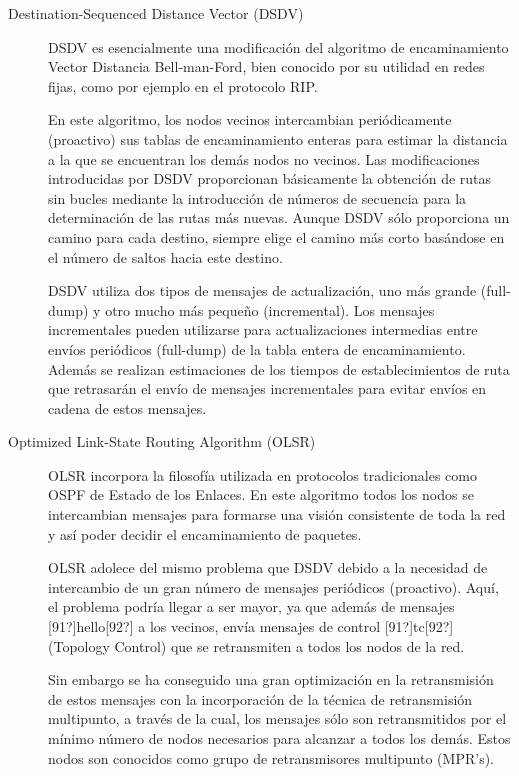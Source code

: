 \begin{description}
\item[Destination-Sequenced Distance Vector (DSDV)] 
DSDV es esencialmente una modificaci\'on del algoritmo de encaminamiento Vector Distancia Bell-man-Ford, bien conocido por su utilidad en redes fijas, como por ejemplo en el protocolo RIP. 

En este algoritmo, los nodos vecinos intercambian peri\'odicamente (proactivo) sus tablas de encaminamiento enteras para estimar la distancia a la que se encuentran los dem\'as nodos no vecinos. Las modificaciones introducidas por DSDV proporcionan b\'asicamente la obtenci\'on de rutas sin bucles mediante la introducci\'on de n\'umeros de secuencia para la determinaci\'on de las rutas m\'as nuevas. Aunque DSDV s\'olo proporciona un camino para cada destino, siempre elige el camino m\'as corto bas\'andose en el n\'umero de saltos hacia este destino.

 DSDV utiliza dos tipos de mensajes de actualizaci\'on, uno m\'as grande (full-dump) y otro mucho m\'as peque\~no (incremental). Los mensajes incrementales pueden utilizarse para actualizaciones intermedias entre env\'ios peri\'odicos (full-dump) de la tabla entera de encaminamiento. Adem\'as se realizan estimaciones de los tiempos de establecimientos de ruta que retrasar\'an el env\'io de mensajes incrementales para evitar env\'ios en cadena de estos mensajes. 

\item[Optimized Link-State Routing Algorithm (OLSR)]
OLSR incorpora la filosof\'ia utilizada en protocolos tradicionales como OSPF de Estado de los Enlaces. En este algoritmo todos los nodos se intercambian mensajes para formarse una visi\'on consistente de toda la red y as\'i poder decidir el encaminamiento de paquetes.

 OLSR adolece del mismo problema que DSDV debido a la necesidad de intercambio de un gran n\'umero de mensajes peri\'odicos (proactivo). Aqu\'i, el problema podr\'ia llegar a ser mayor, ya que adem\'as de mensajes [91?]hello[92?] a los vecinos, env\'ia mensajes de control [91?]tc[92?] (Topology Control) que se retransmiten a todos los nodos de la red. 
 
 Sin embargo se ha conseguido una gran optimizaci\'on en la retransmisi\'on de estos mensajes con la incorporaci\'on de la t\'ecnica de retransmisi\'on multipunto, a trav\'es de la cual, los mensajes s\'olo son retransmitidos por el m\'inimo n\'umero de nodos necesarios para alcanzar a todos los dem\'as. Estos nodos son conocidos como grupo de retransmisores multipunto (MPR's). 


\end{description}
